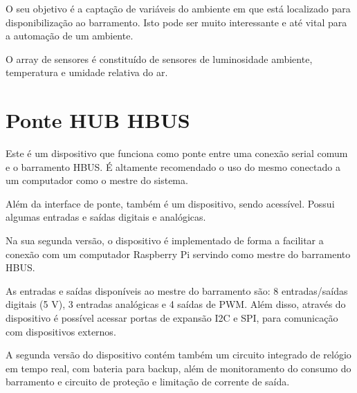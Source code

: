 O seu objetivo é a captação de variáveis do ambiente em que está localizado para disponibilização ao barramento. Isto pode ser muito interessante e até vital para a automação de um ambiente.

O array de sensores é constituído de sensores de luminosidade ambiente, temperatura e umidade relativa do ar.

\section{Ponte HUB HBUS}

Este é um dispositivo que funciona como ponte entre uma conexão serial comum e o barramento HBUS. É altamente recomendado o uso do mesmo conectado a um computador como o mestre do sistema.

Além da interface de ponte, também é um dispositivo, sendo acessível. Possui algumas entradas e saídas digitais e analógicas.

Na sua segunda versão, o dispositivo é implementado de forma a facilitar a conexão com um computador Raspberry Pi servindo como mestre do barramento HBUS.

As entradas e saídas disponíveis ao mestre do barramento são: 8 entradas/saídas digitais (5 V), 3 entradas analógicas e 4 saídas de PWM. Além disso, através do dispositivo é possível acessar portas de expansão I2C e SPI, para comunicação com dispositivos externos.

A segunda versão do dispositivo contém também um circuito integrado de relógio em tempo real, com bateria para backup, além de monitoramento do consumo do barramento e circuito de proteção e limitação de corrente de saída.
